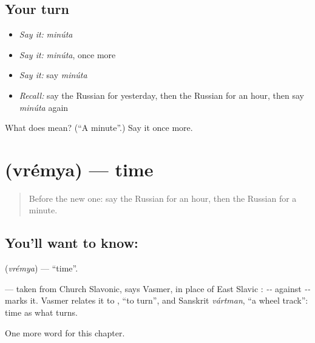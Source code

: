 \subsection*{Your turn}
\begin{itemize}
\raggedright
  \item \emph{Say it:} \emph{minúta}
  \item \emph{Say it:} \emph{minúta}, once more
  \item \emph{Say it:} say \emph{minúta}
  \item \emph{Recall:} say the Russian for yesterday, then the Russian for an hour, then say \emph{minúta} again
\end{itemize}

\begin{tcolorbox}[breakable,colback=teal!4,colframe=teal!35!black,title={Before you move on}]
What does  mean? (\textquotedblleft{}A minute\textquotedblright{}.) Say it once more.
\end{tcolorbox}
\section[\texorpdfstring{\ru{время} (vrémya)}{время (vrémya)}]{ (vrémya) — time}

\label{lesson:RU-C69-time}



\begin{quote}
Before the new one: say the Russian for an hour, then the Russian for a minute.
\end{quote}

\subsection*{You'll want to know: }
\textbf{} (\emph{vrémya}) — \textquotedblleft{}time\textquotedblright{}.

\begin{cousinweb}
\textbf{} — taken from Church Slavonic, says Vasmer, in place of East Slavic \emph{}: \emph{--} against \emph{--} marks it. Vasmer relates it to \emph{}, \textquotedblleft{}to turn\textquotedblright{}, and Sanskrit \emph{vártman}, \textquotedblleft{}a wheel track\textquotedblright{}: time as what turns.
\end{cousinweb}

\begin{grammarlens}[title={What you've built}]
One more word for this chapter.
\end{grammarlens}

